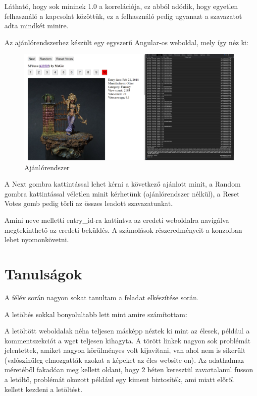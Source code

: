 \documentclass[14pt,a4paper]{article}
\begin{document}
Látható, hogy sok mininek 1.0 a korrelációja, ez abból adódik, hogy egyetlen felhasználó
a kapcsolat közöttük, ez a felhasználó pedig ugyanazt a szavazatot adta mindkét minire.

Az ajánlórendszerhez készült egy egyszerű Angular-os weboldal, mely így néz ki:

\begin{figure}[H]
\centering
\includegraphics[width=1.0\columnwidth]{pics/ajanlorendszer.png}
\caption{Ajánlórendszer}
\end{figure}

A Next gombra kattintással lehet kérni a következő ajánlott minit, a Random gombra kattintással
véletlen minit kérhetünk (ajánlórendszer nélkül), a Reset Votes gomb pedig törli az összes leadott
szavazatunkat.

Amini neve melletti entry\_id-ra kattintva az eredeti weboldalra navigálva megtekinthető az eredeti
beküldés. A számolások részeredményeit a konzolban lehet nyomonkövetni.

\section{Tanulságok}

A félév során nagyon sokat tanultam a feladat elkészítése során.

A letöltés sokkal bonyolultabb lett mint amire számítottam:

A letöltött weboldalak néha teljesen másképp néztek ki mint az élesek, például a kommentszekciót a wget teljesen
kihagyta. A törött linkek nagyon sok problémát jelentettek, amiket nagyon körülményes volt kijavítani, van ahol nem is
sikerült (valószínűleg elmozgatták azokat a képeket az éles website-on). Az adathalmaz méretéből fakadóan meg kellett
oldani, hogy 2 héten keresztül zavartalanul fusson a letöltő, problémát okozott például egy kiment biztosíték, ami
miatt előről kellett kezdeni a letöltést.
\end{document}
